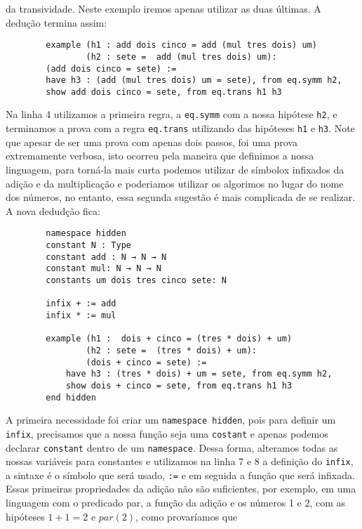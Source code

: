         da transividade. Neste exemplo iremos apenas utilizar as duas últimas. A dedução termina assim:
        \begin{lstlisting}
        example (h1 : add dois cinco = add (mul tres dois) um) 
                (h2 : sete =  add (mul tres dois) um):  
        (add dois cinco = sete) :=
        have h3 : (add (mul tres dois) um = sete), from eq.symm h2,
        show add dois cinco = sete, from eq.trans h1 h3
        \end{lstlisting}
        Na linha 4 utilizamos a primeira regra, a \lstinline{eq.symm} com a nossa hipótese \lstinline{h2}, e terminamos
        a prova com a regra \lstinline{eq.trans} utilizando das hipóteses \lstinline{h1} e \lstinline{h3}. Note que 
        apesar de ser uma prova com apenas dois passos, foi uma prova extremamente verbosa, isto ocorreu pela 
        maneira que definimos a nossa linguagem, para torná-la mais curta podemos utilizar de símbolox infixados
        da adição e da multiplicação e poderiamos utilizar os algorimos no lugar do nome dos números, no entanto,
        essa segunda sugestão é mais complicada de se realizar. A nova dedudção fica:
        \begin{lstlisting}
        namespace hidden
        constant N : Type
        constant add : N → N → N
        constant mul: N → N → N
        constants um dois tres cinco sete: N
            
        infix + := add
        infix * := mul
            
        example (h1 :  dois + cinco = (tres * dois) + um) 
                (h2 : sete =  (tres * dois) + um): 
                (dois + cinco = sete) :=
            have h3 : (tres * dois) + um = sete, from eq.symm h2,
            show dois + cinco = sete, from eq.trans h1 h3
        end hidden 
        \end{lstlisting}
        A primeira necessidade foi criar um \lstinline{namespace hidden}, pois para definir um \lstinline{infix},
        precisamos que a nossa função seja uma \lstinline{costant} e apenas podemos declarar \lstinline{constant}
        dentro de um \lstinline{namespace}. Dessa forma, alteramos todas as nossas variáveis para constantes e 
        utilizamos na linha 7 e 8 a definição do \lstinline{infix}, a sintaxe é o símbolo que será usado, \lstinline{:=}
        e em seguida a função que será infixada.
        Essas primeiras propriedades da adição não são suficientes, por exemplo, em uma linguagem com o predicado
        par, a função da adição e os números 1 e 2, com as hipóteses $1+1 =2$ e $par(2)$, como provaríamos que 
